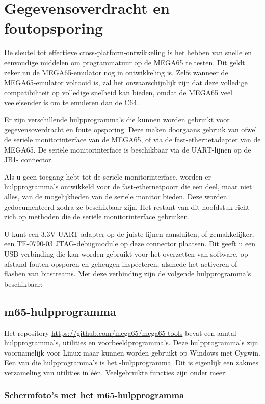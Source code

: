 \chapter{Gegevensoverdracht en foutopsporing}
\label{cha:transfer-and-debug-tools}

De sleutel tot effectieve cross-platform-ontwikkeling is het hebben van snelle en
eenvoudige middelen om programmatuur op de MEGA65 te testen. Dit
geldt zeker nu de MEGA65-emulator nog in ontwikkeling is.
Zelfs wanneer de MEGA65-emulator voltooid is, zal het onwaarschijnlijk
zijn dat deze volledige compatibiliteit op volledige snelheid kan bieden,
omdat de MEGA65 veel veeleisender is om te emuleren dan de C64.

Er zijn verschillende hulpprogramma's die kunnen worden gebruikt voor gegevensoverdracht en
foute opsporing. Deze maken doorgaans gebruik van ofwel de seriële
monitorinterface van de MEGA65, of via de fast-ethernetadapter van de MEGA65. De
seriële monitorinterface is beschikbaar via de UART-lijnen op de JB1-
connector.

Als u geen toegang hebt tot de seriële monitorinterface, worden er
hulpprogramma's ontwikkeld voor de fast-ethernetpoort die een deel,
maar niet alles, van de mogelijkheden van de seriële monitor
bieden. Deze worden gedocumenteerd zodra ze beschikbaar zijn. Het
restant van dit hoofdstuk richt zich op methoden die de seriële
monitorinterface gebruiken.

U kunt een 3.3V UART-adapter op de juiste
lijnen aansluiten, of gemakkelijker, een TE-0790-03 JTAG-debugmodule
op deze connector plaatsen. Dit geeft u een USB-verbinding die kan worden gebruikt
voor het overzetten van software, op afstand fouten opsporen en geheugen inspecteren, alsmede
het activeren of flashen van bitstreams. Met deze verbinding
zijn de volgende hulpprogramma's beschikbaar:

\section{m65-hulpprogramma}

Het repository \url{https://github.com/mega65/mega65-tools} bevat een
aantal hulpprogramma's, utilities en voorbeeldprogramma's. Deze hulpprogramma's zijn voornamelijk voor Linux maar kunnen worden gebruikt op Windows met Cygwin. Een van die hulpprogramma's is
het -hulpprogramma. Dit is eigenlijk een zakmes
verzameling van utilities in één. Veelgebruikte functies
zijn onder meer:

\subsection{Schermfoto's met het m65-hulpprogramma}

